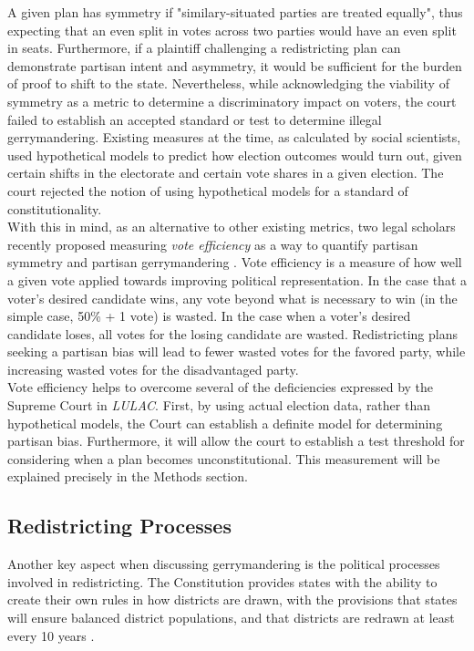 \documentclass[12pt]{article}
\begin{document}
  A given plan has symmetry if "similary-situated parties are treated equally", thus expecting that an even split in votes across two parties would have an even split in seats. Furthermore, if a plaintiff challenging a redistricting plan can demonstrate partisan intent and asymmetry, it would be sufficient for the burden of proof to shift to the state.  Nevertheless, while acknowledging the viability of symmetry as a metric to determine a discriminatory impact on voters, the court failed to establish an accepted standard or test to determine illegal gerrymandering.  Existing measures at the time, as calculated by social scientists, used hypothetical models to predict how election outcomes would turn out, given certain shifts in the electorate and certain vote shares in a given election. The court rejected the notion of using hypothetical models for a standard of constitutionality. \cite{LULAC v. Perry, 2006} \\
  
  With this in mind,  as an alternative to other existing metrics, two legal scholars recently proposed measuring \textit{vote efficiency} as a way to quantify partisan symmetry and partisan gerrymandering \cite{Stephanopolous & McGhee}.  Vote efficiency is a measure of how well a given vote applied towards improving political representation.  In the case that a voter's desired candidate wins, any vote beyond what is necessary to win (in the simple case, 50\% + 1 vote) is wasted.  In the case when a voter's desired candidate loses, all votes for the losing candidate are wasted. Redistricting plans seeking a partisan bias will lead to fewer wasted votes for the favored party, while increasing wasted votes for the disadvantaged party. \\
  
  Vote efficiency helps to overcome several of the deficiencies expressed by the Supreme Court in \textit{LULAC}.  First, by using actual election data, rather than hypothetical models, the Court can establish a definite model for determining partisan bias.  Furthermore, it will allow the court to establish a test threshold for considering when a plan becomes unconstitutional.  This measurement will be explained precisely in the Methods section.

\subsection{Redistricting Processes}
Another key aspect when discussing gerrymandering is the political processes involved in redistricting.  The Constitution provides states with the ability to create their own rules in how districts are drawn, with the provisions that states will ensure balanced district populations, and that districts are redrawn at least every 10 years \cite{LULAC v. Perry, 2006}.\\
\end{document}
